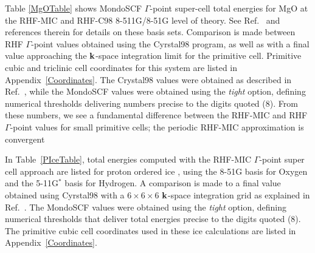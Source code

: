 \documentclass[prb,aps,nobibnotes,twocolumn,doublespace,twocolumngrid,superbib]{revtex4}
\begin{document}
Table \ref{MgOTable} shows {\sc MondoSCF} $\Gamma$-point super-cell total energies for MgO 
at the RHF-MIC and RHF-C98 8-511G/8-51G level of theory.  See Ref.~\cite{MTowlerLib} and 
references therein for details on these basis sets.  Comparison is made between RHF
$\Gamma$-point values obtained using the {\sc Cyrstal98} program, as well as with a final value 
approaching the $\bf k$-space integration limit for the primitive cell. 
Primitive cubic and triclinic cell coordinates for this system are listed in Appendix~\ref{Coordinates}.
The {\sc Crystal98} values were obtained as described in Ref.~\cite{BCivalleri02}, while the 
{\sc MondoSCF} values were obtained using the {\it tight} option, defining numerical thresholds 
delivering numbers precise to the digits quoted (8).  From these numbers, we see a fundamental 
difference between the RHF-MIC and RHF $\Gamma$-point values for small primitive cells; 
the periodic RHF-MIC approximation is convergent 


In Table~\ref{PIceTable}, total energies computed with the RHF-MIC $\Gamma$-point
super cell approach are listed for proton ordered ice \cite{}, using the 8-51G basis 
for Oxygen and the 5-11G$^*$ basis for Hydrogen.  A comparison is made to a final 
value obtained using {\sc Cyrstal98} with a $6\times6\times6$ $\bf k$-space integration grid
as explained in Ref.~\cite{PIceProceedure}.  The {\sc MondoSCF} values were obtained 
using the {\it tight} option, defining numerical thresholds that deliver total energies
precise to the digits quoted (8).  The primitive cubic cell coordinates used in these
ice calculations are listed in Appendix~\ref{Coordinates}.
\end{document}
